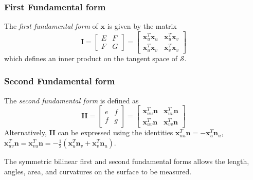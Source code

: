 \documentclass{InsightArticle}
\def \Surface {\mathcal{S}}
\theoremstyle{plain}
\begin{document}
\subsubsection{First Fundamental form}
The \emph{first fundamental form} of $\mathbf{x}$ is given by the matrix
\begin{equation}
  \mathbf{I} =
\left[
  \begin{array}{cc}
    E & F \\
    F & G
  \end{array}
\right] =
\left[
  \begin{array}{cc}
    \mathbf{x}_u^T \mathbf{x}_u & \mathbf{x}_u^T \mathbf{x}_v\\
    \mathbf{x}_u^T \mathbf{x}_v & \mathbf{x}_v^T \mathbf{x}_v
  \end{array}
\right]
\end{equation}
which defines an inner product on the tangent space of $\Surface$.

\subsubsection{Second Fundamental form}
The \emph{second fundamental form} is defined as
\begin{equation}
  \mathbf{II} =
\left[
  \begin{array}{cc}
    e & f\\
    f & g
  \end{array}
\right] =
\left[
  \begin{array}{cc}
    \mathbf{x}_{uu}^T \mathbf{n} & \mathbf{x}_{uv}^T \mathbf{n}\\
    \mathbf{x}_{uv}^T \mathbf{n} & \mathbf{x}_{vv}^T \mathbf{n}
  \end{array}
  \right]
\end{equation}
Alternatively, $\mathbf{II}$ can be expressed using the identities $\mathbf{x}_{uu}^T \mathbf{n} = - \mathbf{x}_{u}^T \mathbf{n}_u$, $\mathbf{x}_{uv}^T \mathbf{n} = \mathbf{x}_{vu}^T \mathbf{n} = - \frac{1}{2} \left( \mathbf{x}_{u}^T \mathbf{n}_v + \mathbf{x}_{v}^T \mathbf{n}_u \right)$.

The symmetric bilinear first and second fundamental forms allows the length, angles, area, and curvatures on the surface to be measured.

\end{document}
